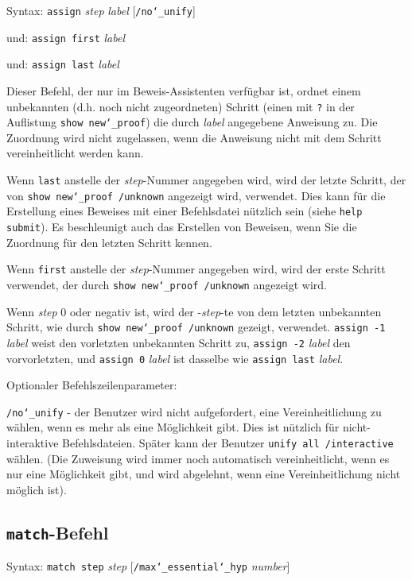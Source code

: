 Syntax:   \texttt{assign} {\em step} {\em label} [\texttt{/no{\char`\_}unify}]

   und:   \texttt{assign first} {\em label}

   und:   \texttt{assign last} {\em label}

Dieser Befehl, der nur im Beweis-Assistenten verfügbar ist, ordnet einem unbekannten (d.h. noch nicht zugeordneten) Schritt (einen mit \texttt{?} in der Auflistung \texttt{show new{\char`\_}proof}) die durch {\em label} angegebene Anweisung zu.  Die Zuordnung wird nicht zugelassen, wenn die Anweisung nicht mit dem Schritt vereinheitlicht werden kann.

Wenn \texttt{last} anstelle der {\em step}-Nummer angegeben wird, wird der letzte Schritt, der von \texttt{show new{\char`\_}proof /unknown} angezeigt wird, verwendet.  Dies kann für die Erstellung eines Beweises mit einer Befehlsdatei nützlich sein (siehe \texttt{help submit}).  Es beschleunigt auch das Erstellen von Beweisen, wenn Sie die Zuordnung für den letzten Schritt kennen.

Wenn \texttt{first} anstelle der {\em step}-Nummer angegeben wird, wird der erste Schritt verwendet, der durch \texttt{show new{\char`\_}proof /unknown} angezeigt wird.

Wenn {\em step} 0 oder negativ ist, wird der -{\em step}-te von dem letzten unbekannten Schritt, wie durch \texttt{show new{\char`\_}proof /unknown} gezeigt, verwendet.  \texttt{assign -1} {\em label} weist den vorletzten unbekannten Schritt zu, \texttt{assign -2} {\em label} den vorvorletzten, und \texttt{assign 0} {\em label} ist dasselbe wie \texttt{assign last} {\em label}.

Optionaler Befehlszeilenparameter:

    \texttt{/no{\char`\_}unify} - der Benutzer wird nicht aufgefordert, eine Vereinheitlichung zu wählen, wenn es mehr als eine Möglichkeit gibt.  Dies ist nützlich für nicht-interaktive Befehlsdateien.  Später kann der Benutzer \texttt{unify all /interactive} wählen. (Die Zuweisung wird immer noch automatisch vereinheitlicht, wenn es nur eine Möglichkeit gibt, und wird abgelehnt, wenn eine Vereinheitlichung nicht möglich ist).


\subsection{\texttt{match}-Befehl}

Syntax:  \texttt{match step} {\em step} [\texttt{/max{\char`\_}essential{\char`\_}hyp}
{\em number}]

